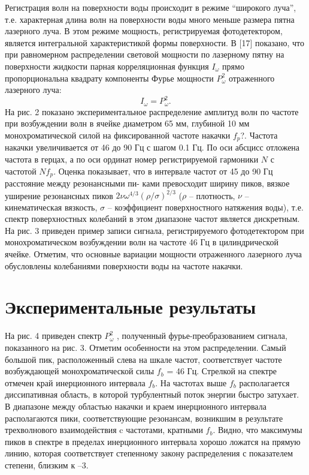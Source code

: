 Регистрация волн на поверхности воды происходит в режиме “широкого луча”, т.е. характерная длина волн на поверхности воды много меньше размера пятна лазерного луча. В этом режиме мощность, регистрируемая фотодетектором, является интегральной характеристикой формы поверхности. В [17] показано, что при равномерном распределении световой мощности по лазерному пятну на поверхности жидкости парная корреляционная функция $I_\omega$ прямо пропорциональна квадрату компоненты Фурье мощности $P_\omega^2$ отраженного лазерного луча:
\begin{equation}
I_\omega = P_\omega^2.
\end{equation}
На рис. 2 показано экспериментальное распределение амплитуд волн по частоте при возбуждении волн в ячейке диаметром 65 мм, глубиной 10 мм монохроматической силой на фиксированной частоте накачки $f_p$?. Частота накачки увеличивается от 46 до 90 Гц с шагом 0.1 Гц. По оси абсцисс отложена частота в герцах, а по оси ординат номер регистрируемой гармоники $N$ с частотой $N f_p$.
Оценка показывает, что в интервале частот от 45 до 90 Гц расстояние между резонансными пи- ками превосходит ширину пиков, вязкое уширение резонансных пиков $2\nu\omega^{4/3}(\rho/\sigma)^{2/3}$ ($\rho$ – плотность, $\nu$ – кинематическая вязкость, $\sigma$ – коэффициент поверхностного натяжения воды), т.е. спектр поверхностных колебаний в этом диапазоне частот является дискретным.
На рис. 3 приведен пример записи сигнала, регистрируемого фотодетектором при монохроматическом возбуждении волн на частоте 46 Гц в цилиндрической ячейке. Отметим, что основные вариации мощности отраженного лазерного луча обусловлены колебаниями поверхности воды на частоте накачки.


\section{Экспериментальные результаты} \label{sect2_2}

На рис. 4 приведен спектр $P^2_\omega$ , полученный фурье-преобразованием сигнала, показанного на рис. 3. Отметим особенности на этом распределении. Самый большой пик, расположенный слева на шкале частот, соответствует частоте возбуждающей монохроматической силы $f_b$ = 46 Гц. Стрелкой на спектре отмечен край инерционного интервала $f_b$. На частотах выше $f_b$ располагается диссипативная область, в которой турбулентный поток энергии быстро затухает. В диапазоне между областью накачки и краем инерционного интервала располагаются пики, соответствующие резонансам, возникшим в результате трехволнового взаимодействия c частотами, кратными $f_b$. Видно, что максимумы пиков в спектре в пределах инерционного интервала хорошо ложатся на прямую линию, которая соответствует степенному закону распределения с показателем степени, близким к –3.


